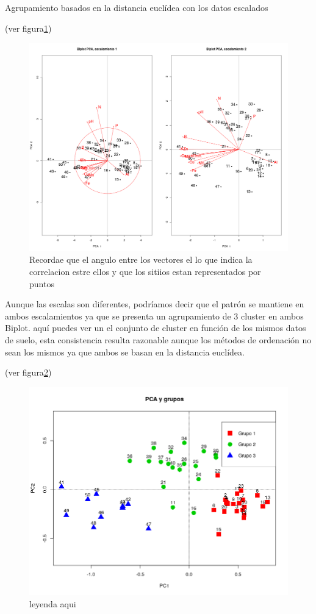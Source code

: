 \documentclass[11pt,]{article}
\begin{document}
Agrupamiento basados en la distancia euclídea con los datos escalados

(ver figura\ref{fig:Biplot_pca1_pca2})

\begin{figure}
\centering
\includegraphics{Biplot_pca1_pca2.png}
\caption{\label{fig:Biplot_pca1_pca2}Recordae que el angulo entre los
vectores el lo que indica la correlacion estre ellos y que los sitiios
estan representados por puntos}
\end{figure}

Aunque las escalas son diferentes, podríamos decir que el patrón se
mantiene en ambos escalamientos ya que se presenta un agrupamiento de 3
cluster en ambos Biplot. aquí puedes ver un el conjunto de cluster en
función de los mismos datos de suelo, esta consistencia resulta
razonable aunque los métodos de ordenación no sean los mismos ya que
ambos se basan en la distancia euclídea.

(ver figura\ref{fig:cluster_pca})

\begin{figure}
\centering
\includegraphics{cluster_pca.png}
\caption{\label{fig:cluster_pca}leyenda aqui}
\end{figure}
\end{document}
